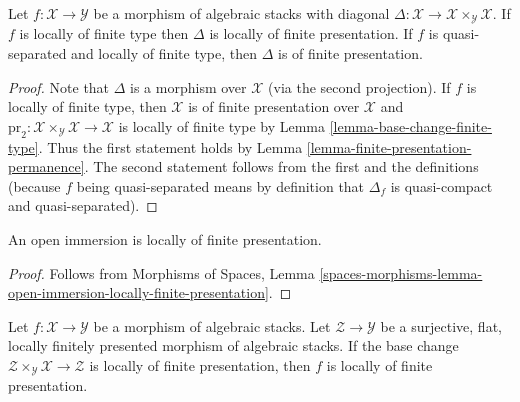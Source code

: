 \begin{lemma}
\label{lemma-diagonal-morphism-finite-type}
Let $f : \mathcal{X} \to \mathcal{Y}$ be a morphism of algebraic stacks
with diagonal
$\Delta : \mathcal{X} \to \mathcal{X} \times_\mathcal{Y} \mathcal{X}$.
If $f$ is locally of finite type then $\Delta$ is
locally of finite presentation. If $f$ is
quasi-separated and locally of finite type, then $\Delta$ is of finite
presentation.
\end{lemma}

\begin{proof}
Note that $\Delta$ is a morphism over $\mathcal{X}$ (via the second
projection). If $f$ is locally of finite type, then
$\mathcal{X}$ is of finite presentation over $\mathcal{X}$ and
$\text{pr}_2 : \mathcal{X} \times_\mathcal{Y} \mathcal{X} \to \mathcal{X}$
is locally of finite type by Lemma \ref{lemma-base-change-finite-type}.
Thus the first statement holds by
Lemma \ref{lemma-finite-presentation-permanence}.
The second statement follows from the first and
the definitions (because $f$ being quasi-separated means
by definition that $\Delta_f$ is quasi-compact and quasi-separated).
\end{proof}

\begin{lemma}
\label{lemma-open-immersion-locally-finite-presentation}
An open immersion is locally of finite presentation.
\end{lemma}

\begin{proof}
Follows from
Morphisms of Spaces,
Lemma \ref{spaces-morphisms-lemma-open-immersion-locally-finite-presentation}.
\end{proof}

\begin{lemma}
\label{lemma-descent-finite-presentation}
Let $f : \mathcal{X} \to \mathcal{Y}$ be a morphism of algebraic stacks.
Let $\mathcal{Z} \to \mathcal{Y}$ be a surjective, flat, locally finitely
presented morphism of algebraic stacks. If the base change
$\mathcal{Z} \times_\mathcal{Y} \mathcal{X} \to \mathcal{Z}$
is locally of finite presentation, then $f$ is locally of finite
presentation.
\end{lemma}

